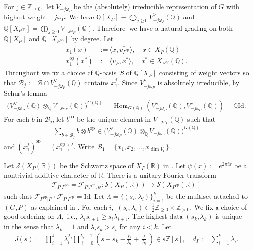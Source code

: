 \documentclass[11pt,a4paper,usenames,dvipsnames,reqno]{amsart}
\numberwithin{equation}{section}
\newcommand{\zz}{\mathbb Z}
\newcommand{\qq}{\mathbb Q}
\newcommand{\rr}{\mathbb R}
\DeclareMathOperator{\Hom}{Hom}
\theoremstyle{definition}
\theoremstyle{remark}
\begin{document}
For $j\in\zz_{\ge 0},$ let $V_{-j\omega_P}$ be the (absolutely) irreducible representation of $G$ with highest weight $-j\omega_P$. We have  $\qq[X_P]=\bigoplus_{j\ge 0} V_{-j\omega_P}^\lor(\qq)$ and $\qq[X_{P^{\mathrm{op}}}]=\bigoplus_{j\ge 0} V_{-j\omega_P}(\qq)$. Therefore, we have a natural grading on both $\qq[X_P]$ and $\qq[X_{P^{\mathrm{op}}}]$ by degree. Let
\begin{align*}
    x_1(x)&:=\langle x, v_{P^{\mathrm{op}}}^\ast\rangle,\quad x\in X_P(\qq),\\
    x_1^{\mathrm{op}}(x^\ast)&:=\langle v_P, x^\ast\rangle,\quad x^\ast\in X_{P^{\mathrm{op}}}(\qq).
\end{align*}
Throughout we fix a choice of $\qq$-basis $\mathcal{B}$ of $\qq[X_P]$ consisting of weight vectors so that $\mathcal{B}_j:=\mathcal{B}\cap V_{-j\omega_P}^\lor(\qq)$ contains $x_1^j$. Since $V_{-j\omega_P}^\lor$ is absolutely irreducible, by Schur's lemma
\begin{align*}
    \big(V_{-j\omega_P}^\lor(\qq)\otimes_\qq V_{-j\omega_P}(\qq)\big)^{G(\qq)}=\Hom_{G(\qq)}(V_{-j\omega_P}^\lor(\qq),V_{-j\omega_P}^\lor(\qq))=\qq\mathrm{Id}.
\end{align*}
For each $b$ in $\mathcal{B}_j$, let $b^{\mathrm{op}}$ be the unique element in $V_{-j\omega_P}(\qq)$ such that
\begin{align*}
    \sum_{b\in \mathcal{B}_j} b\otimes b^{\mathrm{op}}\in \big(V_{-j\omega_P}^\lor(\qq)\otimes_\qq V_{-j\omega_P}(\qq)\big)^{G(\qq)}
\end{align*}
and $(x_1^j)^\mathrm{op}=(x_1^{\mathrm{op}})^j$. Write $\mathcal{B}_1=\{x_1,x_2,\ldots, x_{\dim V_P}\}.$

Let $\mathcal{S}(X_P(\rr))$ be the Schwartz space of $X_P(\rr)$ in \cite{Getz:Hsu:Leslie, Hsu:asymptotics}. Let $\psi(x):=e^{2\pi i x}$ be a nontrivial additive character of $\rr$. There is a unitary Fourier transform
\begin{align*}
   \mathcal{F}_{P|P^{\mathrm{op}}}=\mathcal{F}_{P|P^{\mathrm{op}},\psi}: \mathcal{S}(X_P(\rr))\longrightarrow \mathcal{S}(X_{P^{\mathrm{op}}}(\rr))
\end{align*}
such that $\mathcal{F}_{P^{\mathrm{op}}|P}\circ\mathcal{F}_{P|P^{\mathrm{op}}}=\mathrm{Id}.$  Let $\Lambda=\{(s_i,\lambda_i)\}_{i=1}^k$ be the multiset attached to $(G,P)$ as explained in \cite[\S 3.2]{Hsu:asymptotics}. For each $i,$ $(s_i,\lambda_i)\in \frac{1}{2}\zz_{\ge 0}\times \zz_{>0}.$ We fix a choice of good ordering on $\Lambda,$ i.e., $\lambda_i s_{i+1}\ge s_i\lambda_{i+1}.$ The highest data $(s_k,\lambda_k)$ is unique in the sense that $\lambda_k=1$ and $\lambda_i s_k>s_i$ for any $i<k$. Let
\begin{align*}
    J(s):=\prod_{i=1}^k \lambda_i^{\lambda_i}\prod_{\ell=0}^{\lambda_i-1}\left(s+s_k-\frac{s_i}{\lambda_i} +\frac{\ell}{\lambda_i}\right)\in s\zz[s],\quad d_P:=\sum_{i=1}^k \lambda_i.
\end{align*}
\end{document}
